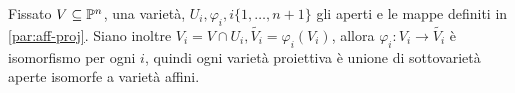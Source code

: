 \begin{comment}
                \tilde{\varphi}(f+g)(P) = (f+g) \circ \varphi (P) = f(\varphi(P)) + g(\varphi(P)) = \tilde{\varphi}(f)(P) + \tilde{\varphi}(g)(P) 
            \end{equation*}
            Analogamente: \begin{equation*}
                \tilde{\varphi}(fg)(P) = (fg) \circ \varphi (P) = f(\varphi(P)g(\varphi(P))) = \tilde{\varphi}(f)(P)\tilde{\varphi}(g)(P)
            \end{equation*}
            Questo prova che $\tilde{\varphi}$ è un omomorfismo. \\ 
            Dimostro che ogni per ogni omomorfismo $\tilde{\varphi} : \gG(Y) \to \gG(X)$ esiste una mappa polinomiale $\varphi : X \to Y$ tale che $\tilde{\varphi}$ sia l'omomorfismo associato a $\varphi$.
            Sia $\tilde{\varphi}$ fissato e sia, per ogni $i \in {1,\ldots,m}$, $p_i \in k[X_1,\ldots,X_n]$ tale che $\tilde{\varphi}(\pi_Y(Y_i)) = \pi_X(p_i)$. Allora $\varphi : X \to Y$ che associa a $P, \varphi(P) = 
            (p_1(P),\ldots,p_m(P)) \in Y$ è una mappa polinomiale di $X$ in $Y$ e, per costruzione è tale che $\tilde{\varphi}(f) = f \circ \varphi$ per ogni $f \in \gG(Y)$. \\
            Sia ora $\varphi : X \to Y$ un morfismo e sia $\tilde{\varphi} : \gG(Y) \to \gG(X)$ l'omomorfismo indotto. Per quanto appena visto esiste una mappa polinomiale $p : X \to Y$ tale che l'omomorfismo 
            indotto da $p$ è $\tilde{\varphi}$. Allora, per ogni $f \in \gG(Y), f \circ \varphi = f \circ p$; quindi: \begin{equation*}
                \forall f \in \gG(Y) \forall F \in \pi_Y^{-1}(f) \pi_Y(F) \circ \varphi = \pi_Y(F) \circ p = \pi_X(F \circ p)
            \end{equation*}
            Quindi le funzioni $F \circ \varphi, F \circ p$, come funzioni da $X$ in $k$, sono uguali per ogni $F \in k[Y_1,\ldots,Y_m]$, ne segue $\varphi = p$.
        \end{proof}
    \end{comment}
    \begin{esempio}
        Fissato $V \subseteq \P^n$, una varietà, $U_i,\varphi_i, i \{1,\ldots,n+1\}$ gli aperti e le mappe definiti in \ref{par:aff-proj}. Siano inoltre $V_i = V \cap U_i, 
        \tilde{V_i} = \varphi_i(V_i)$, allora $\varphi_i : V_i \to \tilde{V_i}$ è isomorfismo per ogni $i$, quindi ogni varietà proiettiva è unione di sottovarietà aperte isomorfe a varietà affini.
    \end{esempio}
